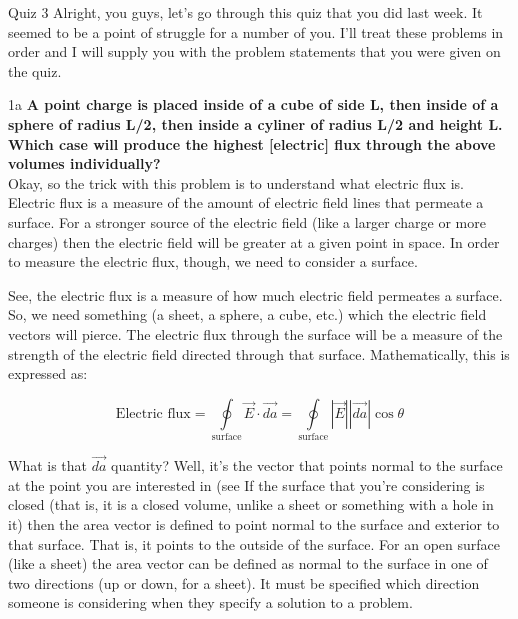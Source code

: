 \begin{homeworkProblem}{Quiz 3}
        Alright, you guys, let's go through this quiz that you did last
        week. It seemed to be a point of struggle for a number of
        you. I'll treat these problems in order and I will supply you
        with the problem statements that you were given on the quiz.

    \begin{homeworkSection}{1a}
        \textbf{A point charge is placed inside of a cube of side L,
        then inside of a sphere of radius L/2, then inside a cyliner of
        radius L/2 and height L. Which case will produce the highest
        [electric] flux through the above volumes individually?}
        \\

        Okay, so the trick with this problem is to understand what
        electric flux is. Electric flux is a measure of the amount of
        electric field lines that permeate a surface. For a stronger
        source of the electric field (like a larger charge or more
        charges) then the electric field will be greater at a given
        point in space. In order to measure the electric flux, though,
        we need to consider a surface. 
       
        See, the electric flux is a measure of how much electric field
        permeates a surface. So, we need something (a sheet, a sphere, a
        cube, etc.) which the electric field vectors will pierce. The
        electric flux through the surface will be a measure of the
        strength of the electric field directed through that surface.
        Mathematically, this is expressed as:
        
        \[
        \text{Electric flux} = \oint\limits_{\text{surface}}
        \vec{E}\cdot\vec{da} = \oint\limits_{\text{surface}} |\vec{E}|
        |\vec{da}| \cos\theta 
        \]
       
        What is that $\vec{da}$ quantity? Well, it's the vector that
        points normal to the surface at the point you are interested in
        (see %
        If the surface that you're considering is closed (that is, it
        is a closed volume, unlike a sheet or something with a hole in
        it) then the area vector is defined to point normal to the
        surface and exterior to that surface. That is, it points to the
        outside of the surface. For an open surface (like a sheet) the
        area vector can be defined as normal to the surface in one of
        two directions (up or down, for a sheet). It must be specified
        which direction someone is considering when they specify a
        solution to a problem.
        

\end{homeworkSection}
\end{homeworkProblem}
